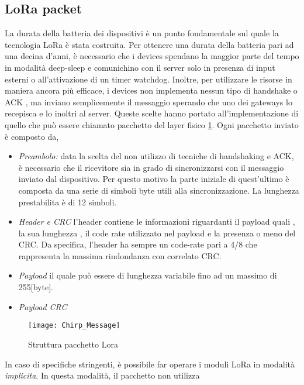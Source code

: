 \subsection{LoRa packet}
La durata della batteria dei dispositivi è un punto fondamentale sul quale la
tecnologia LoRa è stata costruita.  Per ottenere una durata della batteria pari
ad una decina d'anni, è necessario che i devices spendano la maggior parte del
tempo in modalità deep-sleep e comunichino con il server solo in presenza di
input esterni o all'attivazione di un timer watchdog.  Inoltre, per utilizzare
le risorse in maniera ancora più efficace, i devices non implementa nessun tipo
di handshake o ACK , ma inviano semplicemente il messaggio sperando che uno dei
gateways lo recepisca e lo inoltri al server.  Queste scelte hanno portato
all'implementazione di quello che può essere chiamato pacchetto del layer fisico
\ref{fig:phis_pack}.  Ogni pacchetto inviato è composto da,
\begin{itemize}
        \item   \emph{Preambolo:} data la scelta del non utilizzo di tecniche di
                handshaking e ACK, è necessario che il ricevitore sia in grado di
                sincronizzarsi con il messaggio inviato dal dispositivo. Per questo
                motivo la parte iniziale di quest'ultimo è composta da una serie di
                simboli byte utili alla sincronizzazione. La lunghezza prestabilita è di
                12 simboli.
        \item   \emph{Header e CRC} l'header contiene le informazioni riguardanti
                il payload quali , la sua lunghezza , il code rate utilizzato nel
                payload e la presenza o meno del CRC. Da specifica, l'header ha sempre
                un code-rate pari a 4/8 che rappresenta la massima rindondanza con
                correlato CRC. 
        \item   \emph{Payload} il quale può essere di lunghezza variabile fino ad
                un massimo di 255[byte].
        \item   \emph{Payload CRC}
\end{itemize}
\begin{figure}[h]
        \centering 
                \texttt{[image: Chirp\_Message]}
        \caption{Struttura pacchetto Lora }
        \label{fig:phis_pack}
\end{figure}
In caso di specifiche stringenti, è possibile far operare i moduli LoRa in
modalità \emph{implicita}. In questa modalità, il pacchetto non utilizza
